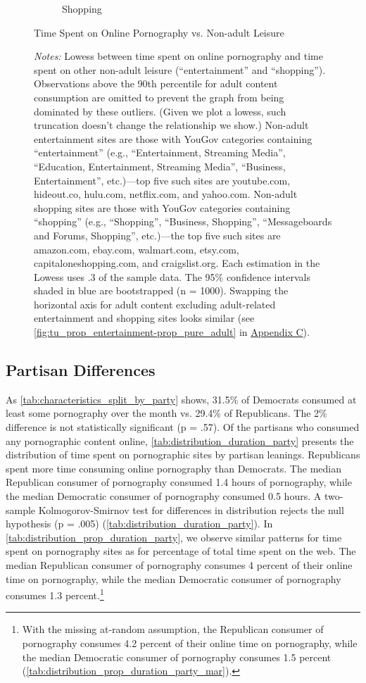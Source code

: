 \documentclass[12pt,twoside]{article}
\begin{document}
\begin{figure}[!ht]
\begin{subfigure}[b]{0.495\textwidth}
         \caption{Shopping}
     \end{subfigure}
\caption{Time Spent on Online Pornography vs. Non-adult Leisure}
\caption*{\footnotesize \emph{Notes:} Lowess between time spent on online pornography and time spent on other non-adult leisure (``entertainment'' and ``shopping''). Observations above the 90th percentile for adult content consumption are omitted to prevent the graph from being dominated by these outliers. (Given we plot a lowess, such truncation doesn't change the relationship we show.) Non-adult entertainment sites are those with YouGov categories containing ``entertainment'' (e.g., ``Entertainment, Streaming Media'', ``Education, Entertainment, Streaming Media'', ``Business, Entertainment'', etc.)---top five such sites are youtube.com, hideout.co, hulu.com, netflix.com, and yahoo.com. Non-adult shopping sites are those with YouGov categories containing ``shopping'' (e.g., ``Shopping'', ``Business, Shopping'', ``Messageboards and Forums, Shopping'', etc.)---the top five such sites are amazon.com, ebay.com, walmart.com, etsy.com, capitaloneshopping.com, and craigslist.org. Each estimation in the Lowess uses .3 of the sample data.
The 95\% confidence intervals shaded in blue are bootstrapped (n = 1000). Swapping the horizontal axis for adult content excluding adult-related entertainment and shopping sites looks similar (see \cref{fig:tu_prop_entertainment-prop_pure_adult} in \hyperref[sm:smC]{Appendix C}). 
}
\end{figure}

\subsection{Partisan Differences}
\label{subsec:partisan_differences}
As \cref{tab:characteristics_split_by_party} shows, 31.5\% of Democrats consumed at least some pornography over the month vs. 29.4\% of Republicans. The 2\% difference is not statistically significant (p = .57). Of the partisans who consumed any pornographic content online, \cref{tab:distribution_duration_party} presents the distribution of time spent on pornographic sites by partisan leanings. Republicans spent more time consuming online pornography than Democrats. The median Republican consumer of pornography consumed 1.4 hours of pornography, while the median Democratic consumer of pornography consumed 0.5 hours. A two-sample Kolmogorov-Smirnov test for differences in distribution rejects the null hypothesis (p = .005) (\cref{tab:distribution_duration_party}). In \cref{tab:distribution_prop_duration_party}, we observe similar patterns for time spent on pornography sites as for percentage of total time spent on the web. The median Republican consumer of pornography consumes 4 percent of their online time on pornography, while the median Democratic consumer of pornography consumes 1.3 percent.\footnote{
    With the missing at-random assumption, the Republican consumer of pornography consumes 4.2 percent of their online time on pornography, while the median Democratic consumer of pornography consumes 1.5 percent (\cref{tab:distribution_prop_duration_party_mar}).
}
\end{document}

